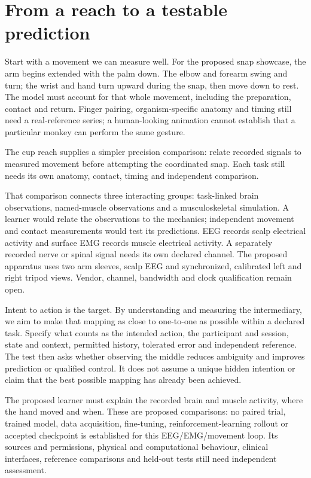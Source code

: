 \section{From a reach to a testable prediction}
Start with a movement we can measure well. For the proposed snap showcase,
the arm begins extended with the palm down. The elbow and forearm swing and
turn; the wrist and hand turn upward during the snap, then move down to rest.
The model must account for that whole movement, including the preparation,
contact and return. Finger pairing, organism-specific anatomy and timing still
need a real-reference series; a human-looking animation cannot establish that
a particular monkey can perform the same gesture.

The cup reach supplies a simpler precision comparison: relate recorded signals
to measured movement before attempting the coordinated snap. Each task still
needs its own anatomy, contact, timing and independent comparison.

That comparison connects three interacting groups: task-linked brain
observations, named-muscle observations and a musculoskeletal simulation.
A learner would relate the observations to the mechanics; independent movement
and contact measurements would test its predictions. EEG records scalp
electrical activity and surface EMG records muscle electrical activity.
A separately recorded nerve or spinal signal needs its own declared channel.
The proposed apparatus uses two arm sleeves, scalp EEG and synchronized,
calibrated left and right tripod views. Vendor, channel, bandwidth and clock
qualification remain open.

Intent to action is the target. By understanding and measuring the intermediary,
we aim to make that mapping as close to one-to-one as possible within a declared
task. Specify what counts as the intended action, the participant and session,
state and context, permitted history, tolerated error and independent reference.
The test then asks whether observing the middle reduces ambiguity and improves
prediction or qualified control. It does not assume a unique hidden intention
or claim that the best possible mapping has already been achieved.

The proposed learner must explain the recorded brain and muscle activity,
where the hand moved and when. These are proposed comparisons: no paired trial,
trained model, data acquisition, fine-tuning, reinforcement-learning rollout or
accepted checkpoint is established for this EEG/EMG/movement loop. Its sources
and permissions, physical and computational behaviour, clinical interfaces,
reference comparisons and held-out tests still need independent assessment.

